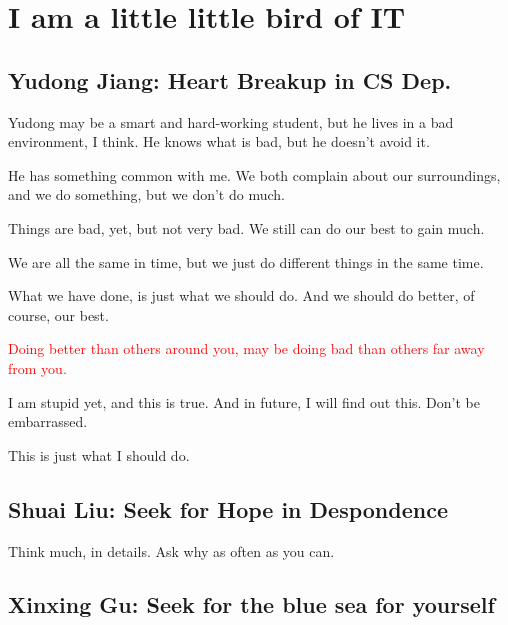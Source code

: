 %
%
%

\chapter{I am a little little bird of IT}
\label{intro} %


\section{Yudong Jiang: Heart Breakup in CS Dep.}
\label{sec:1}

Yudong may be a smart and hard-working student, but he lives in a bad environment, I think. He knows what is bad, but he doesn't avoid it.

He has something common with me. We both complain about our surroundings, and we do something, but we don't do much.

Things are bad, yet, but not very bad. We still can do our best to gain much.

We are all the same in time, but we just do different things in the same time.

What we have done, is just what we should do. And we should do better, of course, our best.

\textcolor{red}{Doing better than others around you, may be doing bad than others far away from you.}

I am stupid yet, and this is true. And in future, I will find out this. Don't be embarrassed.

This is just what I should do.

\section{Shuai Liu: Seek for Hope in Despondence}
\label{sec:2}

Think much, in details. Ask why as often as you can.

\section{Xinxing Gu: Seek for the blue sea for yourself}

